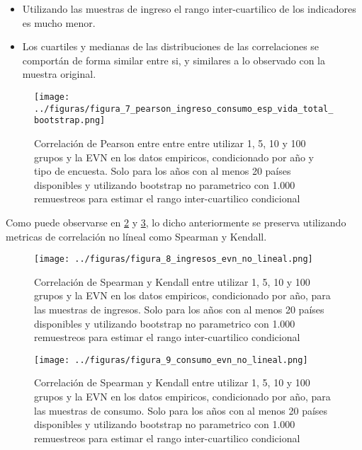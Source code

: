 \begin{itemize}
    \item Utilizando las muestras de ingreso el rango inter-cuartilico de los indicadores es mucho menor.
    \item Los cuartiles y medianas de las distribuciones de las correlaciones se comportán de forma similar entre si, y similares a lo observado con la muestra original.
\end{itemize}

\begin{figure}[H] %
    \centering %
    \texttt{[image: ../figuras/figura\_7\_pearson\_ingreso\_consumo\_esp\_vida\_total\_bootstrap.png]} %
    \caption{Correlación de Pearson entre entre entre utilizar 1, 5, 10 y 100 grupos y la EVN en los datos empiricos, condicionado por año y tipo de encuesta. Solo para los años con al menos 20 países disponibles y utilizando bootstrap no parametrico con 1.000 remuestreos para estimar el rango inter-cuartilico condicional}
    \label{fig:7} %
\end{figure}

Como puede observarse en \ref{fig:8} y \ref{fig:9}, lo dicho anteriormente se preserva utilizando metricas de correlación no líneal como Spearman y Kendall.

\begin{figure}[H] %
    \centering %
    \texttt{[image: ../figuras/figura\_8\_ingresos\_evn\_no\_lineal.png]} %
    \caption{Correlación de Spearman y Kendall entre utilizar 1, 5, 10 y 100 grupos y la EVN en los datos empiricos, condicionado por año, para las muestras de ingresos. Solo para los años con al menos 20 países disponibles y utilizando bootstrap no parametrico con 1.000 remuestreos para estimar el rango inter-cuartilico condicional}
    \label{fig:8} %
\end{figure}



\begin{figure}[H] %
    \centering %
    \texttt{[image: ../figuras/figura\_9\_consumo\_evn\_no\_lineal.png]} %
    \caption{Correlación de Spearman y Kendall entre utilizar 1, 5, 10 y 100 grupos y la EVN en los datos empiricos, condicionado por año, para las muestras de consumo. Solo para los años con al menos 20 países disponibles y utilizando bootstrap no parametrico con 1.000 remuestreos para estimar el rango inter-cuartilico condicional}
    \label{fig:9} %
\end{figure}

